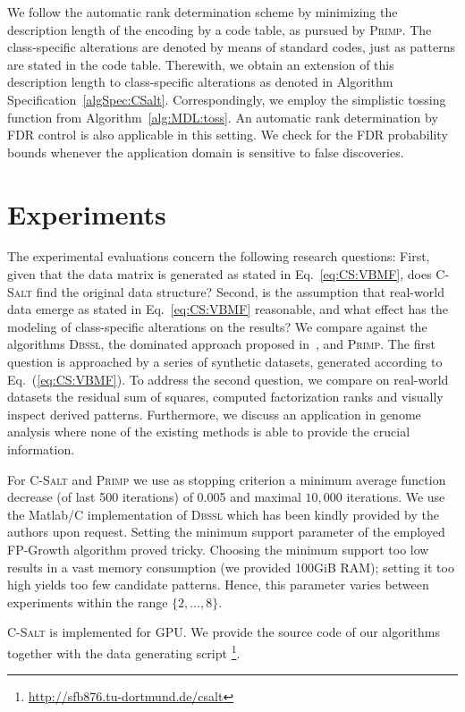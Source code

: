 We follow the automatic rank determination scheme by minimizing the description length of the encoding by a code table, as pursued by \textsc{Primp}. The class-specific alterations are denoted by means of standard codes, just as patterns are stated in the code table. Therewith, we obtain an extension of this description length to class-specific alterations as denoted in Algorithm Specification~\ref{algSpec:CSalt}. Correspondingly, we employ the simplistic tossing function from Algorithm~\ref{alg:MDL:toss}. An automatic rank determination by FDR control is also applicable in this setting. We check for the FDR probability bounds whenever the application domain is sensitive to false discoveries.  
\section{Experiments}
The experimental evaluations concern the following research questions: First, given that the data matrix is generated as stated in Eq.~\eqref{eq:CS:VBMF}, does \textsc{C-Salt} find the original data structure?
Second, is the assumption that real-world data emerge as stated in Eq.~\eqref{eq:CS:VBMF} reasonable, and what effect has the modeling of class-specific alterations on the results?
We compare against the algorithms \textsc{Dbssl}, the dominated approach proposed in~\cite{miettienen2012finding}, and \textsc{Primp}.
The first question is approached by a series of synthetic datasets, generated according to Eq.~(\ref{eq:CS:VBMF}). To address the second question, we compare on real-world datasets the residual sum of squares, computed factorization ranks and visually inspect derived patterns.
Furthermore, we discuss an application in genome analysis where none of the existing methods is able to provide the crucial information.

For \textsc{C-Salt} and \textsc{Primp} we use as stopping criterion a minimum average function decrease (of last 500 iterations) of 0.005 and maximal $10,000$ iterations. We use the Matlab/C implementation of \textsc{Dbssl} which has been kindly provided by the authors upon request. Setting the minimum support parameter of the employed FP-Growth algorithm proved tricky. Choosing the minimum support too low results in a vast memory consumption (we provided 100GiB RAM); setting it too high yields too few candidate patterns. Hence, this parameter varies between experiments within the range $\{2,\ldots,8\}$.

\textsc{C-Salt} is implemented for GPU. We provide the source code of our algorithms together with the data generating script \footnote{\url{http://sfb876.tu-dortmund.de/csalt}}.
